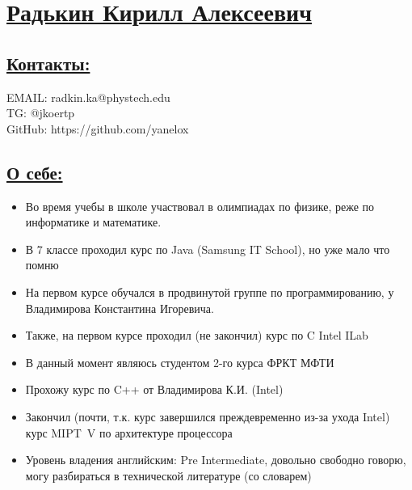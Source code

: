 \documentclass[a4paper, 12pt]{article}
\begin{document}
\section*{\underline{Радькин Кирилл Алексеевич}}
\subsection*{\underline{Контакты:}}
EMAIL: radkin.ka@phystech.edu \\
TG: @jkoertp \\
GitHub: https://github.com/yanelox \\

\subsection*{\underline{О себе:}}

\begin{itemize}
    \item Во время учебы в школе участвовал в олимпиадах по физике, реже по информатике и математике. 
    \item В 7 классе проходил курс по Java (Samsung IT School), но уже мало что помню
    \item На первом курсе обучался в продвинутой группе по программированию, у Владимирова Константина Игоревича. 
    \item Также, на первом курсе проходил (не закончил) курс по C Intel ILab
    \item В данный момент являюсь студентом 2-го курса ФРКТ МФТИ
    \item Прохожу курс по C++ от Владимирова К.И. (Intel)
    \item Закончил (почти, т.к. курс завершился преждевременно из-за ухода Intel) курс MIPT~V по архитектуре процессора 
    \item Уровень владения английским: Pre Intermediate, довольно свободно говорю, могу разбираться в технической литературе (со словарем)
\end{itemize}
\end{document}
